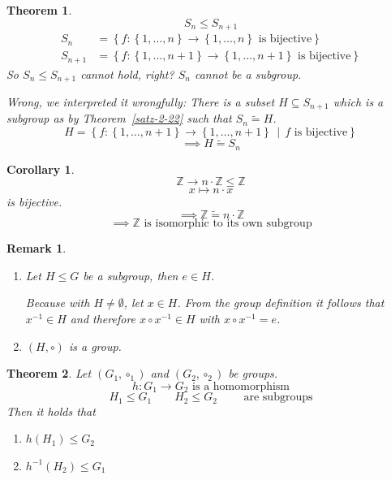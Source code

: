 \documentclass[a4paper,landscape,twocolumn]{article}
\newcommand\set[1]{\left\{#1\right\}}
\newcommand\setdef[2]{\left\{#1\,\middle|\,#2\right\}}
\newtheorem{theorem}{Theorem}[section]
\newtheorem{rem}{Remark}[section]
\newtheorem{cor}{Corollary}[section]
\begin{document}
\begin{theorem}
  \[ S_n \leq S_{n+1} \]
  \begin{align*}
    S_n &= \set{f: \set{1, \dots, n} \rightarrow \set{1, \dots, n} \text{ is bijective}} \\
    S_{n+1} &= \set{f: \set{1, \dots, n+1} \rightarrow \set{1, \dots, n+1} \text{ is bijective}}
  \end{align*}
  So $S_n \leq S_{n+1}$ cannot hold, right? $S_n$ cannot be a subgroup.

  Wrong, we interpreted it wrongfully:
  There is a subset $H \subseteq S_{n+1}$ which is a subgroup as by Theorem~\ref{satz-2-22}
  such that $S_n \tilde{=} H$.
  \[ H = \setdef{f: \set{1, \dots, n+1} \rightarrow \set{1, \dots, n+1}}{f \text{ is bijective}} \]
  \[ \implies H \tilde{=} S_n \]
\end{theorem}

\begin{cor}
  \[ \mathbb Z \rightarrow n \cdot \mathbb Z \leq \mathbb Z \]
  \[ x \mapsto n \cdot x \]
  is bijective.
  \[ \implies \mathbb Z \tilde{=} n \cdot \mathbb Z \]
  \[ \implies \mathbb Z \text{ is isomorphic to its own subgroup} \]
\end{cor}

\begin{rem}
  \begin{enumerate}
    \item
      Let $H \leq G$ be a subgroup, then $e \in H$.

      Because with $H \neq \emptyset$, let $x \in H$.
      From the group definition it follows that $x^{-1} \in H$
      and therefore $x \circ x^{-1} \in H$ with $x \circ x^{-1} = e$.
    \item $(H, \circ)$ is a group.
  \end{enumerate}
\end{rem}

\begin{theorem}
  Let $(G_1, \circ_1)$ and $(G_2, \circ_2)$ be groups.
  \[ h: G_1 \rightarrow G_2 \text{ is a homomorphism} \]
  \[ H_1 \leq G_1 \qquad H_2 \leq G_2 \qquad \text{ are subgroups} \]
  Then it holds that
  \begin{enumerate}
    \item $h(H_1) \leq G_2$
    \item $h^{-1}(H_2) \leq G_1$
  \end{enumerate}
\end{theorem}
\end{document}
